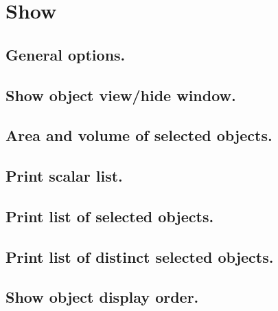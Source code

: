 
\chapter{Show}
\minitoc 


\section{General options.} 
\section{Show object view/hide window.}
\section{Area and volume of selected objects.}
\section{Print scalar list.}
\section{Print list of selected objects.}
\section{Print list of distinct selected objects.}
\section{Show object display order.}
